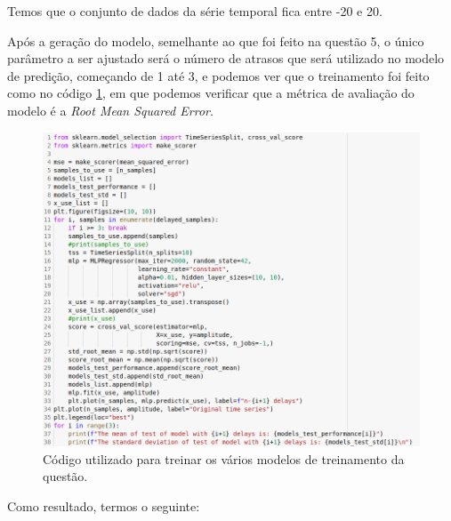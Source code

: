 \documentclass[a4paper, 12pt]{article}
\begin{document}
Temos que o conjunto de dados da série temporal fica entre -20 e 20.

Após a geração do modelo, semelhante ao que foi feito na questão 5, o único parâmetro a ser ajustado será o número de atrasos que será utilizado no modelo de predição, começando de 1 até 3, e podemos ver que o treinamento foi feito como no código \ref{fig:quest9_train}, em que podemos verificar que a métrica de avaliação do modelo é a \textit{Root Mean Squared Error}.

\begin{figure}[h]
	\centering
	\includegraphics[width=0.85\linewidth]{figuras/quest9_train}
    \caption{Código utilizado para treinar os vários modelos de treinamento da questão.}
    \label{fig:quest9_train}
\end{figure}
\FloatBarrier

Como resultado, termos o seguinte:
\end{document}
